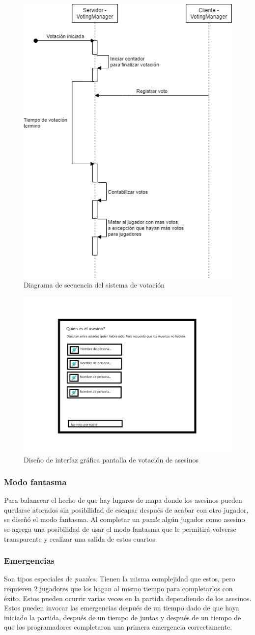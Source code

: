 \begin{figure}[H]
    \centering
    \includegraphics[width=0.5\linewidth]{images/diagrama_secuencia_votos.png}
    \caption{Diagrama de secuencia del sistema de votación}
    \label{fig:diagrama_sec_votacion}
\end{figure}
\begin{figure}[H]
    \centering
    \includegraphics[width=0.5\linewidth]{images/votacion.png}
    \caption{Diseño de interfaz gráfica pantalla de votación de asesinos}
    \label{fig:diagrama_ui_votacion}
\end{figure}

\subsubsection{Modo fantasma}
Para balancear el hecho de que hay lugares de mapa donde los asesinos pueden quedarse atorados sin posibilidad de escapar después de acabar con otro jugador, se diseñó el modo fantasma. Al completar un \textit{puzzle} algún jugador como asesino se agrega una posibilidad de usar el modo fantasma que le permitirá volverse transparente y realizar una salida de estos cuartos.

\subsubsection{Emergencias}
Son tipos especiales de \textit{puzzles}. Tienen la misma complejidad que estos, pero requieren 2 jugadores que los hagan al mismo tiempo para completarlos con éxito. Estos pueden ocurrir varias veces en la partida dependiendo de los asesinos. Estos pueden invocar las emergencias después de un tiempo dado de que haya iniciado la partida, después de un tiempo de juntas y después de un tiempo de que los programadores completaron una primera emergencia correctamente.


